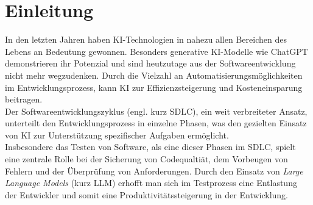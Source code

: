 
\chapter{Einleitung}

In den letzten Jahren haben \acs{KI}-Technologien in nahezu allen Bereichen des Lebens an Bedeutung gewonnen. Besonders generative KI-Modelle wie ChatGPT 
demonstrieren ihr Potenzial und sind heutzutage aus der Softwareentwicklung nicht mehr wegzudenken. \cite{hammermann_ki_nodate} Durch die Vielzahl an Automatisierungsmöglichkeiten
im Entwicklungsprozess, kann KI zur Effizienzsteigerung und Kosteneinsparung beitragen.\\
Der Softwareentwicklungszyklus (engl. kurz \acs{SDLC}), ein weit verbreiteter Ansatz, unterteilt den Entwicklungsprozess in einzelne Phasen, was den gezielten Einsatz 
von KI zur Unterstützung spezifischer Aufgaben ermöglicht.\\ Insbesondere das Testen von Software, als eine dieser Phasen im SDLC,
spielt eine zentrale Rolle bei der Sicherung von Codequaltiät, dem Vorbeugen von Fehlern und der Überprüfung von Anforderungen. \cite{noauthor_was_nodate} Durch den Einsatz von \textit{Large Language Models} (kurz LLM) erhofft man sich im Testprozess eine 
Entlastung der Entwickler und somit eine Produktivitätssteigerung in der Entwicklung.


